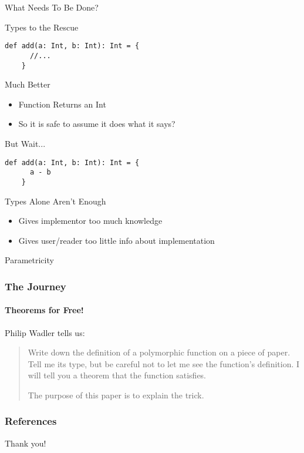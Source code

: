 \documentclass[bigger]{beamer}
\begin{document}
\begin{section}{What Needs To Be Done?}
\begin{frame}[fragile]{Types to the Rescue}
  \begin{lstlisting}[style=scala]
    def add(a: Int, b: Int): Int = {
      //...
    }
  \end{lstlisting}
\end{frame}

\begin{frame}[fragile]{Much Better}
  \begin{itemize}
  \item Function Returns an Int
  \item So it is safe to assume it does what it says? 
  \end{itemize}
\end{frame}

\begin{frame}[fragile]{But Wait...}
  \begin{lstlisting}[style=scala]
    def add(a: Int, b: Int): Int = {
      a - b
    }
  \end{lstlisting}
\end{frame}

\begin{frame}[fragile]{Types Alone Aren't Enough}
  \begin{itemize}
  \item Gives implementor too much knowledge
  \item Gives user/reader too little info about implementation
  \end{itemize}
\end{frame}

\end{section}

\begin{section}{Parametricity}
\begin{frame}
\frametitle{The Journey}
\framesubtitle{Theorems for Free!}
\begin{block}{Philip Wadler \cite{wadler1989theorems} tells us:}
\begin{quotation}
Write down the definition of a polymorphic function on a piece of paper. Tell me its type, but be careful not to let me see the function's definition. I will tell you a theorem that the function satisfies.

The purpose of this paper is to explain the trick.
\end{quotation}
\end{block}
\end{frame}
\end{section}

\begin{frame}
\frametitle{References}




\end{frame}

\begin{frame}
Thank you!
\end{frame}
\end{document}
